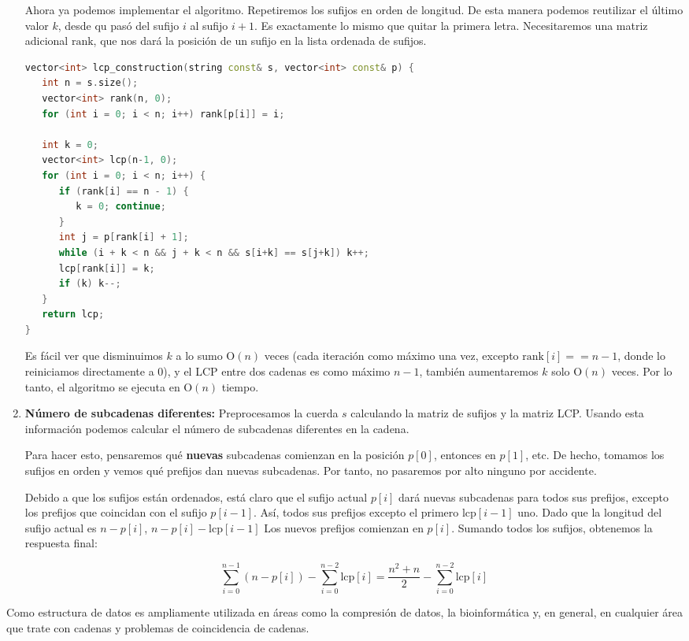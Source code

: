\begin{enumerate}
Ahora ya podemos implementar el algoritmo. Repetiremos los sufijos en orden de longitud. De esta manera podemos reutilizar el último valor $k$, desde qu 
pasó del sufijo $i$ al sufijo $i+1$. Es exactamente lo mismo que quitar la primera letra. Necesitaremos una matriz adicional $\text{rank}$, que nos dará la 
posición de un sufijo en la lista ordenada de sufijos.
\begin{lstlisting}[language=C++]	
vector<int> lcp_construction(string const& s, vector<int> const& p) {
   int n = s.size();
   vector<int> rank(n, 0);
   for (int i = 0; i < n; i++) rank[p[i]] = i;
		
   int k = 0;
   vector<int> lcp(n-1, 0);
   for (int i = 0; i < n; i++) {
      if (rank[i] == n - 1) {
         k = 0; continue;
      }
      int j = p[rank[i] + 1];
      while (i + k < n && j + k < n && s[i+k] == s[j+k]) k++;
      lcp[rank[i]] = k;
      if (k) k--;
   }
   return lcp;
}
\end{lstlisting}	


Es fácil ver que disminuimos $k$ a lo sumo O$(n)$ veces (cada iteración como máximo una vez, excepto $\text{rank}[i]==n-1$, donde lo reiniciamos directamente 
a $0$), y el LCP entre dos cadenas es como máximo $n-1$, también aumentaremos $k$ solo O$(n)$ veces. Por lo tanto, el algoritmo se ejecuta en O$(n)$ tiempo.
	
	\item \textbf{Número de subcadenas diferentes:} Preprocesamos la cuerda $s$ calculando la matriz de sufijos y la matriz LCP. Usando esta información
	podemos calcular el número de subcadenas diferentes en la cadena.
	
	Para hacer esto, pensaremos qué \textbf{nuevas} subcadenas comienzan en la posición $p[0]$, entonces en $p[1]$, etc. De hecho, tomamos los sufijos en orden y 
	vemos qué prefijos dan nuevas subcadenas. Por tanto, no pasaremos por alto ninguno por accidente.
	
	Debido a que los sufijos están ordenados, está claro que el sufijo actual $p[i]$ dará nuevas subcadenas para todos sus prefijos, excepto los prefijos que
	coincidan con el sufijo $p[i-1]$. Así, todos sus prefijos excepto el primero $\text{lcp}[i-1]$ uno. Dado que la longitud del sufijo actual es $n-p[i]$,
	$n-p[i]-\text{lcp}[i-1]$ Los nuevos prefijos comienzan en $p[i]$. Sumando todos los sufijos, obtenemos la respuesta final:
	
	$$\sum_{i=0}^{n-1} (n - p[i]) - \sum_{i=0}^{n-2} \text{lcp}[i] = \frac{n^2 + n}{2} - \sum_{i=0}^{n-2} \text{lcp}[i]$$
\end{enumerate}

Como estructura de datos es ampliamente utilizada en áreas como la compresión de datos, la bioinformática y, en general, en cualquier área que trate con cadenas y problemas de coincidencia de cadenas.
	